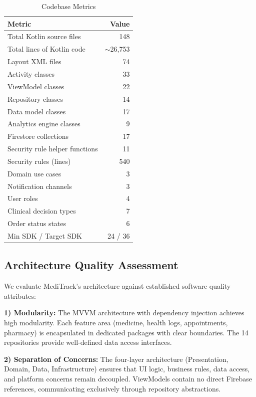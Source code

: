 \documentclass[journal,onecolumn,web]{ieeecolor}
\begin{document}
\begin{table}[!t]
\caption{Codebase Metrics}
\label{tab:metrics}
\centering
\begin{tabular}{l r}
\toprule
{\bf Metric} & {\bf Value} \\
\midrule
Total Kotlin source files       & 148 \\
Total lines of Kotlin code      & $\sim$26,753 \\
Layout XML files                & 74 \\
Activity classes                & 33 \\
ViewModel classes               & 22 \\
Repository classes              & 14 \\
Data model classes              & 17 \\
Analytics engine classes        & 9 \\
Firestore collections           & 17 \\
Security rule helper functions  & 11 \\
Security rules (lines)          & 540 \\
Domain use cases                & 3 \\
Notification channels           & 3 \\
User roles                      & 4 \\
Clinical decision types         & 7 \\
Order status states             & 6 \\
Min SDK / Target SDK            & 24 / 36 \\
\bottomrule
\end{tabular}
\end{table}

\subsection{Architecture Quality Assessment}
We evaluate MediTrack's architecture against
established software quality attributes:

{\bf 1) Modularity:} The MVVM architecture with
dependency injection achieves high modularity. Each
feature area (medicine, health logs, appointments,
pharmacy) is encapsulated in dedicated packages with
clear boundaries. The 14 repositories provide
well-defined data access interfaces.

{\bf 2) Separation of Concerns:} The four-layer
architecture (Presentation, Domain, Data,
Infrastructure) ensures that UI logic, business
rules, data access, and platform concerns remain
decoupled. ViewModels contain no direct Firebase
references, communicating exclusively through
repository abstractions.
\end{document}
